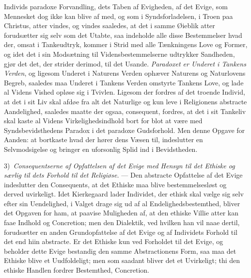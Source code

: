 \documentclass[12pt,a4paper]{book}
\newcommand{\opage}[1]{\marginnote{\footnotesize\textit{[#1]}}}
\begin{document}
Individs paradoxe Forvandling, dets Taben af Evigheden, af det Evige, som Mennesket dog ikke kan
blive af med, og som i Syndsforladelsen, i Troen paa Christus, atter vindes, og vindes saaledes,
at det i samme Øieblik atter forudsætter sig selv som det Utabte, saa indeholde alle disse
Bestemmelser hvad der, omsat i Tankeudtryk, kommer i Strid med alle Tænkningens Love og Former,
og idet det i sin Modsætning til Vidensbestemmelserne udtrykker Sandheden, gjør det det, der
strider derimod, til det Usande.
\emph{Paradoxet er Underet i Tankens Verden}, og ligesom Underet i Naturens Verden ophæver
Naturens og Naturlovens Begreb, saaledes maa Underet i Tankens Verden omstyrte Tankens Love, og
lade al Videns Vished opløse sig i Tvivlen. Ligesom der fordres af det troende Individ, at det i
sit Liv skal afdøe fra alt det Naturlige og kun leve i Religionens abstracte Aandelighed,
saaledes maatte der ogsaa, consequent, fordres, at det i sit Tankeliv skal kaste al Videns
Virkelighedsindhold bort for blot at være med Syndsbevidsthedens Paradox i det paradoxe
Gudsforhold. Men denne Opgave for Aanden: at bortkaste hvad der hører dens Væsen til, indeslutter
en Selvmodsigelse og bringer en uforsonlig Splid ind i Bevidstheden.

3)~\emph{Consequentserne af Opfattelsen af det Evige med Hensyn til det Ethiske og særlig til
dets Forhold til det Religiøse.} --- Den abstracte Opfattelse af det Evige indeslutter den
Consequents, at det Ethiske maa blive bestemmelsesløst og derved uvirkeligt. Idet Kierkegaard
lader Individet, der ethisk skal vælge sig selv efter sin Uendelighed, i Valget drage sig ud af
al Endelighedsbestemthed, bliver det Opgaven for ham, at paavise Muligheden af, at den ethiske
Villie atter kan faae Indhold og Concretion; men den Dialektik, ved hvilken han vil naae dertil,
forudsætter en anden Grundopfattelse af det Evige og af Individets Forhold til det end hiin
abstracte. Er det Ethiske kun ved Forholdet til det Evige, og beholder \opage{221}dette Evige bestandig den
samme Abstractionens Form, saa maa det Ethiske blive et Uudfoldeligt; men som saadant bliver det
et Uvirkeligt; thi den ethiske Handlen fordrer Bestemthed, Concretion.
\end{document}
